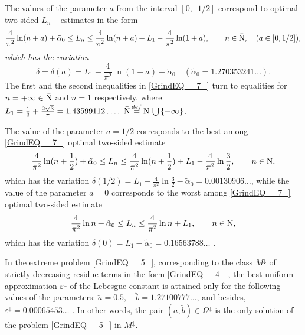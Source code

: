 \documentclass[
11pt,%
tightenlines,%
twoside,%
onecolumn,%
nofloats,%
nobibnotes,%
nofootinbib,%
superscriptaddress,%
noshowpacs,%
centertags]%
{revtex4}
\begin{document}
\begin{lemma}
The values of the parameter $a$ from the interval $[0,\, \, \, 1/2]$ correspond to optimal two-sided $L_n$ -- estimates in the form
\begin{equation} \label{GrindEQ__7_}  \frac{4}{\pi ^{2} } \ln (n+ a)  +  \tilde{\alpha }_{0}    \le   L_{n}   \le   \frac{4}{\pi ^{2} } \ln (n+ a)  +  L_{1}  -  \frac{4}{\pi ^{2} } \ln (1+a), \qquad  n\in \bar{{\rm N} },\quad (a\in [0,1/2]),
\end{equation}
\textit{which has the variation}
\begin{equation} \label{GrindEQ__8_}  \delta = \delta (a)= L_{1}  - \frac{4}{\pi ^{2} } \ln (1+a) - \tilde{\alpha }_{0} \quad (\tilde{\alpha }_{0} = 1.270353241\dots).
\end{equation}
The first and the second inequalities in \eqref{GrindEQ__7_} turn to equalities for $n = +\infty \in \bar{{\rm N} }$  and  $n = 1$ respectively, where $L_{1} =\frac{1}{3} +\frac{2\sqrt{3} }{\pi } = 1.43599112\dots, \,\, \bar{{\rm N} } \mathop{=}\limits^{def}  {\rm N}\, \bigcup\, \{ +\infty \}$.
\end{lemma}

\begin{lemma}
The value of the parameter $a=1/2$ corresponds to the best among \eqref{GrindEQ__7_} optimal two-sided estimate
\begin{equation} \label{GrindEQ__9_} \frac{4}{\pi ^{2} } \ln (n  +\frac{1}{2} )  +   \tilde{\alpha }_{0}   \le   L_{n}   \le   \frac{4}{\pi ^{2} } \ln (n+  \frac{1}{2} )  +  L_{1}  -  \frac{4}{\pi ^{2} } \ln \frac{3}{2},  \qquad       n\in \bar{{\rm N,} }
\end{equation}
which has the variation $\delta (1/2)  =  L_{1}  -  \frac{4}{\pi ^{2} }  \ln \frac{3}{2}    -  \tilde{\alpha }_{0}   =  0.00130906\dots$,
while the value of the parameter $a=0$ corresponds to the worst
	among \eqref{GrindEQ__7_} optimal two-sided estimate
\begin{equation} \label{GrindEQ__10_} \frac{4}{\pi ^{2} } \ln n   +   \tilde{\alpha }_{0}   \le   L_{n}   \le    \frac{4}{\pi ^{2} } \ln n  +  L_{1} ,  \qquad       n\in  \bar{{\rm N} },    \end{equation}
which has the variation $\delta(0) = L_{1} - \tilde{\alpha }_{0}  = 0.16563788\dots$ .
\end{lemma}

\begin{lemma}
In the extreme problem \eqref{GrindEQ__5_}, corresponding to the class $M^{\downarrow }$ of strictly decreasing residue terms in the form \eqref{GrindEQ__4_}, the best uniform approximation $\varepsilon ^{\downarrow }$ of the Lebesgue constant is attained only for the following values of the parameters: $\breve{a}= 0.5,\quad \breve{b}=1.27100777\dots$, and besides, $\varepsilon ^{\downarrow } =0.00065453\dots$ . In other words, the pair $(\breve{a}, \breve{b})\in \Omega ^{\downarrow } $ is the only solution of the problem \eqref{GrindEQ__5_} in $M^{\downarrow } $.
\end{lemma}
\end{document}
